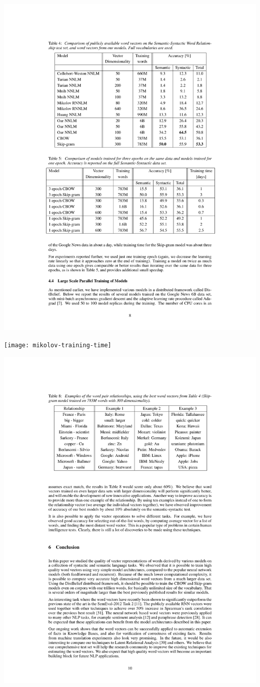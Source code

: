 \documentclass{beamer}
\begin{document}
\begin{frame}
\includegraphics[width=\linewidth]{mikolov-results2}
\end{frame}

\begin{frame}
\texttt{[image: mikolov-training-time]}
\end{frame}

\begin{frame}
\includegraphics[width=\linewidth]{mikolov-example-relationships}
\end{frame}
\end{document}
